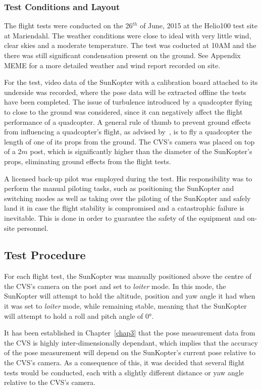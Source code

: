 \subsubsection{Test Conditions and Layout}

The flight tests were conducted on the 26$^{th}$ of June, 2015 at the Helio100 test site at Mariendahl. The weather conditions were close to ideal with very little wind, clear skies and a moderate temperature. The test was coducted at 10AM and the there was still significant condensation present on the ground. See Appendix MEME for a more detailed weather and wind report recorded on site.

For the test, video data of the SunKopter with a calibration board attached to its underside was recorded, where the pose data will be extracted offline the tests have been completed. The issue of turbulence introduced by a quadcopter flying to close to the ground was considered, since it can negatively affect the flight performance of a quadcopter. A general rule of thumb to prevent ground effects from influencing a quadcopter's flight, as advised by~\cite{basson-flight-test}, is to fly a quadcopter the length of one of its props from the ground. The CVS's camera was placed on top of a 2$m$ post, which is significantly higher than the diameter of the SunKopter's props, eliminating ground effects from the flight tests.

A licensed back-up pilot was employed during the test. His responsibility was to perform the manual piloting tasks, such as positioning the SunKopter and switching modes as well as taking over the piloting of the SunKopter and safely land it in case the flight stability is compromised and a catastrophic failure is inevitable. This is done in order to guarantee the safety of the equipment and on-site personnel. 

\subsection{Test Procedure}

For each flight test, the SunKopter was manually positioned above the centre of the CVS's camera on the post and set to \emph{loiter} mode. In this mode, the SunKopter will attempt to hold the altitude, position and yaw angle it had when it was set to \emph{loiter} mode, while remaining stable, meaning that the SunKopter will attempt to hold a roll and pitch angle of $\ang{0}$. 

It has been established in Chapter~\ref{chap3} that the pose measurement data from the CVS is highly inter-dimensionally dependant, which implies that the accuracy of the pose measurement will depend on the SunKopter's current pose relative to the CVS's camera. As a consequence of this, it was decided that several flight tests would be conducted, each with a slightly different distance or yaw angle relative to the CVS's camera. 

